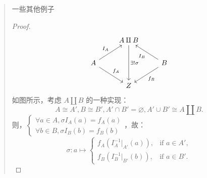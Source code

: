 \begin{quote}{一些其他例子}
\begin{itemize}
              \begin{proof}{}
                  \[
                      \begin{tikzcd}
                          {}                                  & A\amalg B \arrow[dd, "\exists !\sigma"] & {}                                  \\
                          A\arrow[ru, "I_A"]\arrow[rd, "f_A"] & {}                                      & B\arrow[ul, "I_B"]\arrow[ld, "f_B"] \\
                          {}                                  & Z                                       & {}
                      \end{tikzcd}
                  \]
                  如图所示，考虑 \(A \amalg B\) 的一种实现：
                  \[
                      A\cong A',B\cong B',A'\cap B'=\varnothing,A'\cup B'\cong A\amalg B
                      .\]
                  则，\(\begin{cases}
                      \forall a\in A, \sigma I_A(a) = f_A(a) \\
                      \forall b\in B, \sigma I_B(b) = f_B(b)
                  \end{cases}\)，故：
                  \[
                      \sigma : a\mapsto \begin{cases}
                          f_A\left( I_A^{-1} |_{A'} (a) \right) , & \text{if } a \in A', \\
                          f_B\left( I_B^{-1} |_{B'} (b) \right) , & \text{if } a \in B'.
                      \end{cases}
                  \]
              \end{proof}
    \end{itemize}
\end{quote}

